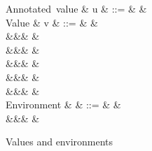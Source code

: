 \begin{figure}
\begin{syntaxfig}
\small
\mbox{Annotated value}
&
u
&
::=
&
&
\\[1mm]
\mbox{Value}
&
v
&
::=
&
\exUnit
&
\\
&&&
&
\\
&&&
&
\\
&&&
&
\\
&&&
\exClosure{\rho}{\exFun{\sigma}}
&
\\
&&&
&
\\[1mm]
\mbox{Environment}
&
\rho
&
::=
&
\envEmpty
&
\\
&&&
&
\end{syntaxfig}
\caption{Values and environments}
\end{figure}
